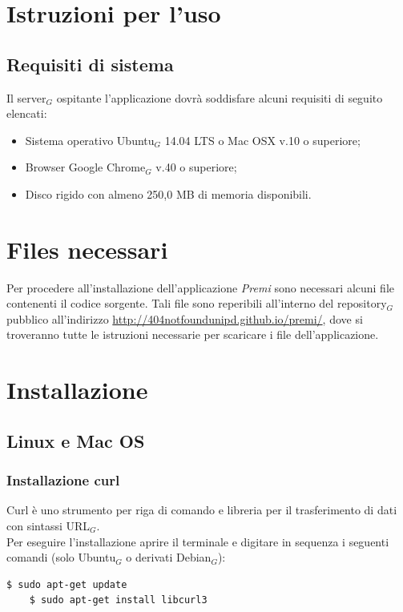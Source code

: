 \section{Istruzioni per l'uso}
\subsection{Requisiti di sistema}
Il server$_G$ ospitante l'applicazione dovrà soddisfare alcuni requisiti di seguito elencati:
\begin{itemize}
\item Sistema operativo Ubuntu$_G$ 14.04 LTS o Mac OSX v.10 o superiore;
\item Browser Google Chrome$_G$ v.40 o superiore;
\item Disco rigido con almeno 250,0 MB di memoria disponibili.
\end{itemize}

\section{Files necessari}
Per procedere all'installazione dell'applicazione \emph{Premi} sono necessari alcuni file contenenti il codice sorgente.
Tali file sono reperibili all'interno del repository$_G$ pubblico all'indirizzo \href{http://404notfoundunipd.github.io/premi/}{http://404notfoundunipd.github.io/premi/}, dove si troveranno tutte le istruzioni necessarie per scaricare i file dell'applicazione.

\section{Installazione}
\subsection{Linux e Mac OS}

\subsubsection{Installazione curl}
Curl è uno strumento per riga di comando e libreria per il trasferimento di dati con sintassi URL$_G$. \\

\noindent Per eseguire l'installazione aprire il terminale e digitare in sequenza i seguenti comandi (solo Ubuntu$_G$ o derivati Debian$_G$):

\begin{lstlisting}[style=DOS]
	$ sudo apt-get update
	$ sudo apt-get install libcurl3
\end{lstlisting}

